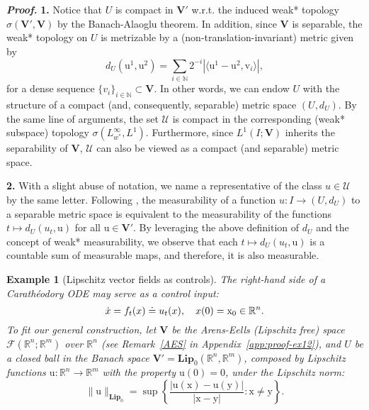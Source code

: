 \documentclass[sn-mathphys-num]{sn-jnl}
\numberwithin{equation}{section}
\theoremstyle{mythm}
\theoremstyle{mydef}
\newtheorem{example}[proposition]{Example}
\renewenvironment{proof}{\smallskip\noindent\emph{\textbf{Proof.}}%
  \hspace{1pt}}{\hspace{-5pt}{\nobreak\quad\nobreak\hfill\nobreak%
    $\square$\vspace{2pt}\par}\smallskip\goodbreak}
\newcommand{\R}{\mathbb{R}}
\begin{document}
\begin{proof} \textbf{1.} Notice that $U$ is compact in $\bm V'$ w.r.t. the induced weak* topology $\sigma(\bm V', \bm V)$ by the Banach-Alaoglu theorem. In addition, since $\bm V$ is separable, the weak* topology on $U$ is metrizable by a (non-translation-invariant) metric given by
\[
    d_{U}(\mathrm u^1, \mathrm u^2) = \sum_{i \in \mathbb N} 2^{-i} \left|\langle \mathrm u^1 - \mathrm u^2, \mathrm v_i\rangle\right|,
\]
for a dense sequence \(\{v_i\}_{i \in \mathbb N} \subset \bm V\). %
In other words, we can endow $U$ with the structure of a compact (and, consequently, separable)  metric space $(U, d_{U})$. By the same line of arguments, the set ${\mathcal U}$ is compact in the corresponding (weak* subspace) topology $\sigma({L}^\infty_{w^*}, {L}^1)$. Furthermore, since ${L}^1(I; \bm V)$ inherits the separability of $\bm V$, $\mathcal{U}$ can also be viewed as a compact (and separable) metric space. %



\textbf{2.} With a slight abuse of notation, we name a representative of the class $u \in \mathcal U$ by the same letter. Following \cite[Theorem I.4.20]{warga1972optimal}, the measurability of a function $u \colon I \to (U, d_{U})$ to a separable metric space is equivalent to the measurability of the functions $t \mapsto d_{U}(u_t, {\mathrm{u}})$ for all $\mathrm{u} \in \bm V'$. By leveraging the above definition of $d_{U}$ and the concept of weak* measurability, we observe that each $t \mapsto d_{U}(u_t, {\mathrm{u}})$ is a countable sum of measurable maps, and therefore, it is also measurable.
\end{proof}
\begin{example}[Lipschitz vector fields as controls]\label{ex1}
The right-hand side of a Carath\'{e}odory ODE may serve as a control input:
\begin{equation}
        \dot x = f_t(x) \doteq u_t(x), \quad x(0)={\rm x}_0 \in \R^n.\label{ODE-ex1}
\end{equation}
To fit our general construction, let $\bm V$ be the Arens-Eells (Lipschitz free) space $\bm{\mathcal F}(\R^n;\R^m)$ over $\R^n$ (see Remark~\ref{AES} in Appendix~\ref{app:proof-ex12}), and $U$ be a closed ball in the Banach space $\bm V' = \bm{Lip}_0(\R^n, \R^m)$, composed by Lipschitz functions $\mathrm u\colon \R^n \to \R^m$ with the property $\mathrm u(0)=0$, under the Lipschitz norm:
    \[
    \|\mathrm u\|_{\bm{Lip}_0} = %
    \sup\left\{\displaystyle\frac{|\mathrm u(\mathrm x)-\mathrm u(\mathrm y)|}{|\mathrm{x}-\mathrm{y}|}\colon \mathrm x \neq \mathrm y\right\}.
    \]
\end{example}
\end{document}
